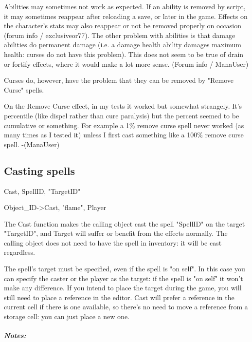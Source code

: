 Abilities may sometimes not work as expected. If an ability is removed
by script, it may sometimes reappear after reloading a save, or later in
the game. Effects on the character's stats may also reappear or not be
removed properly on occasion (forum info / exclusiveor77). The other
problem with abilities is that damage abilities do permanent damage
(i.e. a damage health ability damages maximum health: curses do not have
this problem). This does not seem to be true of drain or fortify
effects, where it would make a lot more sense. (Forum info / ManaUser)

Curses do, however, have the problem that they can be removed by "Remove
Curse" spells.

On the Remove Curse effect, in my tests it worked but somewhat
strangely. It's percentile (like dispel rather than cure paralysis) but
the percent seemed to be cumulative or something. For example a 1\%
remove curse spell never worked (as many times as I tested it) unless I
first cast something like a 100\% remove curse spell. -(ManaUser)

\hypertarget{casting-spells}{%
\subsection{\texorpdfstring{\hfill\break
Casting spells}{ Casting spells}}\label{casting-spells}}

Cast, SpellID, "TargetID"

Object\_ID-\textgreater Cast, "flame", Player

The Cast function makes the calling object cast the spell "SpellID" on
the target "TargetID", and Target will suffer or benefit from the
effects normally. The calling object does not need to have the spell in
inventory: it will be cast regardless.

The spell's target must be specified, even if the spell is "on self". In
this case you can specify the caster or the player as the target: if the
spell is "on self" it won't make any difference. If you intend to place
the target during the game, you will still need to place a reference in
the editor. Cast will prefer a reference in the current cell if there is
one available, so there's no need to move a reference from a storage
cell: you can just place a new one.

\hypertarget{notes}{%
\subparagraph{Notes:}\label{notes}}

